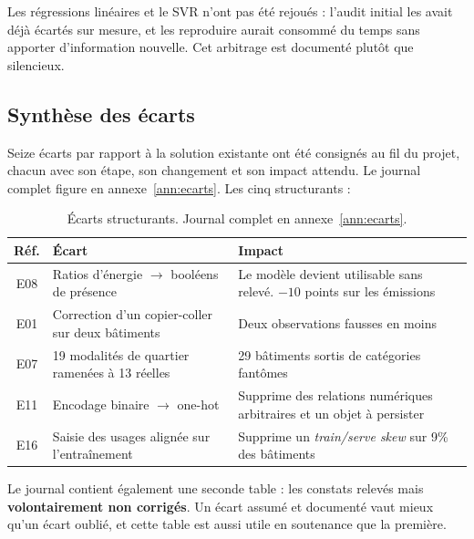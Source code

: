 Les régressions linéaires et le SVR n'ont pas été rejoués : l'audit initial les
avait déjà écartés sur mesure, et les reproduire aurait consommé du temps sans
apporter d'information nouvelle. Cet arbitrage est documenté plutôt que
silencieux.

\subsection{Synthèse des écarts}

Seize écarts par rapport à la solution existante ont été consignés au fil du
projet, chacun avec son étape, son changement et son impact attendu. Le journal
complet figure en annexe~\ref{ann:ecarts}. Les cinq structurants :

\begin{table}[H]
\centering
\small
\begin{tabularx}{\linewidth}{@{}cL{4.2cm}X@{}}
\toprule
\textbf{Réf.} & \textbf{Écart} & \textbf{Impact} \\
\midrule
E08 & Ratios d'énergie $\rightarrow$ booléens de présence & Le modèle devient utilisable sans relevé. $-10$ points sur les émissions \\
E01 & Correction d'un copier-coller sur deux bâtiments & Deux observations fausses en moins \\
E07 & 19 modalités de quartier ramenées à 13 réelles & 29 bâtiments sortis de catégories fantômes \\
E11 & Encodage binaire $\rightarrow$ one-hot & Supprime des relations numériques arbitraires et un objet à persister \\
E16 & Saisie des usages alignée sur l'entraînement & Supprime un \emph{train/serve skew} sur 9\% des bâtiments \\
\bottomrule
\end{tabularx}
\caption{Écarts structurants. Journal complet en annexe~\ref{ann:ecarts}.}
\end{table}

Le journal contient également une seconde table : les constats relevés mais
\textbf{volontairement non corrigés}. Un écart assumé et documenté vaut mieux
qu'un écart oublié, et cette table est aussi utile en soutenance que la première.

\newpage
